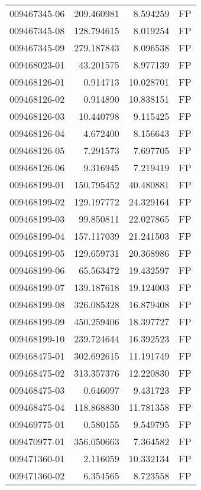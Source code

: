 \begin{tabular}{lrrl}
009467345-06 &  209.460981 &       8.594259 &   FP \\
009467345-08 &  128.794615 &       8.019254 &   FP \\
009467345-09 &  279.187843 &       8.096538 &   FP \\
009468023-01 &   43.201575 &       8.977139 &   FP \\
009468126-01 &    0.914713 &      10.028701 &   FP \\
009468126-02 &    0.914890 &      10.838151 &   FP \\
009468126-03 &   10.440798 &       9.115425 &   FP \\
009468126-04 &    4.672400 &       8.156643 &   FP \\
009468126-05 &    7.291573 &       7.697705 &   FP \\
009468126-06 &    9.316945 &       7.219419 &   FP \\
009468199-01 &  150.795452 &      40.480881 &   FP \\
009468199-02 &  129.197772 &      24.329164 &   FP \\
009468199-03 &   99.850811 &      22.027865 &   FP \\
009468199-04 &  157.117039 &      21.241503 &   FP \\
009468199-05 &  129.659731 &      20.368986 &   FP \\
009468199-06 &   65.563472 &      19.432597 &   FP \\
009468199-07 &  139.187618 &      19.124003 &   FP \\
009468199-08 &  326.085328 &      16.879408 &   FP \\
009468199-09 &  450.259406 &      18.397727 &   FP \\
009468199-10 &  239.724644 &      16.392523 &   FP \\
009468475-01 &  302.692615 &      11.191749 &   FP \\
009468475-02 &  313.357376 &      12.220830 &   FP \\
009468475-03 &    0.646097 &       9.431723 &   FP \\
009468475-04 &  118.868830 &      11.781358 &   FP \\
009469775-01 &    0.580155 &       9.549795 &   FP \\
009470977-01 &  356.050663 &       7.364582 &   FP \\
009471360-01 &    2.116059 &      10.332134 &   FP \\
009471360-02 &    6.354565 &       8.723558 &   FP \\

\end{tabular}
